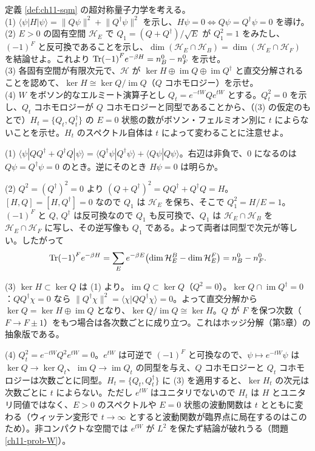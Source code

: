\begin{problem}[難易度 B]\label{ch11-prob-pair}
定義 \ref{def:ch11-sqm} の超対称量子力学を考える。\\
(1) $\langle\psi|H|\psi\rangle=\lVert Q\psi\rVert^2+\lVert Q^\dagger\psi\rVert^2$ を示し、$H\psi=0\iff Q\psi=Q^\dagger\psi=0$ を導け。\\
(2) $E>0$ の固有空間 $\mathcal H_E$ で $Q_1=(Q+Q^\dagger)/\sqrt E$ が $Q_1^2=1$ をみたし、$(-1)^F$ と反可換であることを示し、$\dim(\mathcal H_E\cap\mathcal H_B)=\dim(\mathcal H_E\cap\mathcal H_F)$ を結論せよ。これより $\Tr(-1)^Fe^{-\beta H}=n_B^0-n_F^0$ を示せ。\\
(3) 各固有空間が有限次元で、$\mathcal H$ が $\ker H\oplus\operatorname{im}Q\oplus\operatorname{im}Q^\dagger$ と直交分解されることを認めて、$\ker H\cong\ker Q/\operatorname{im}Q$（$Q$ コホモロジー）を示せ。\\
(4) $W$ をボソン的なエルミート演算子とし $Q_t=e^{-tW}Qe^{tW}$ とする。$Q_t^2=0$ を示し、$Q_t$ コホモロジーが $Q$ コホモロジーと同型であることから、（(3) の仮定のもとで）$H_t=\{Q_t,Q_t^\dagger\}$ の $E=0$ 状態の数がボソン・フェルミオン別に $t$ によらないことを示せ。$H_t$ のスペクトル自体は $t$ によって変わることに注意せよ。
\end{problem}

\begin{solution}
(1) $\langle\psi|QQ^\dagger+Q^\dagger Q|\psi\rangle=\langle Q^\dagger\psi|Q^\dagger\psi\rangle+\langle Q\psi|Q\psi\rangle$。右辺は非負で、$0$ になるのは $Q\psi=Q^\dagger\psi=0$ のとき。逆にそのとき $H\psi=0$ は明らか。

(2) $Q^2=(Q^\dagger)^2=0$ より $(Q+Q^\dagger)^2=QQ^\dagger+Q^\dagger Q=H$。$[H,Q]=[H,Q^\dagger]=0$ なので $Q_1$ は $\mathcal H_E$ を保ち、そこで $Q_1^2=H/E=1$。$(-1)^F$ と $Q$, $Q^\dagger$ は反可換なので $Q_1$ も反可換で、$Q_1$ は $\mathcal H_E\cap\mathcal H_B$ を $\mathcal H_E\cap\mathcal H_F$ に写し、その逆写像も $Q_1$ である。よって両者は同型で次元が等しい。したがって
\[
\Tr(-1)^Fe^{-\beta H}=\sum_Ee^{-\beta E}\bigl(\dim\mathcal H_E^B-\dim\mathcal H_E^F\bigr)=n_B^0-n_F^0 .
\]

(3) $\ker H\subset\ker Q$ は (1) より。$\operatorname{im}Q\subset\ker Q$（$Q^2=0$）。$\ker Q\cap\operatorname{im}Q^\dagger=0$：$Q Q^\dagger\chi=0$ なら $\lVert Q^\dagger\chi\rVert^2=\langle\chi|QQ^\dagger\chi\rangle=0$。よって直交分解から $\ker Q=\ker H\oplus\operatorname{im}Q$ となり、$\ker Q/\operatorname{im}Q\cong\ker H$。$Q$ が $F$ を保つ次数（$F\to F\pm1$）をもつ場合は各次数ごとに成り立つ。これはホッジ分解（第5章）の抽象版である。

(4) $Q_t^2=e^{-tW}Q^2e^{tW}=0$。$e^{tW}$ は可逆で $(-1)^F$ と可換なので、$\psi\mapsto e^{-tW}\psi$ は $\ker Q\to\ker Q_t$、$\operatorname{im}Q\to\operatorname{im}Q_t$ の同型を与え、$Q$ コホモロジーと $Q_t$ コホモロジーは次数ごとに同型。$H_t=\{Q_t,Q_t^\dagger\}$ に (3) を適用すると、$\ker H_t$ の次元は次数ごとに $t$ によらない。ただし $e^{tW}$ はユニタリでないので $H_t$ は $H$ とユニタリ同値ではなく、$E>0$ のスペクトルや $E=0$ 状態の波動関数は $t$ とともに変わる（ウィッテン変形で $t\to\infty$ とすると波動関数が臨界点に局在するのはこのため）。非コンパクトな空間では $e^{tW}$ が $L^2$ を保たず結論が破れうる（問題 \ref{ch11-prob-W}）。
\end{solution}

